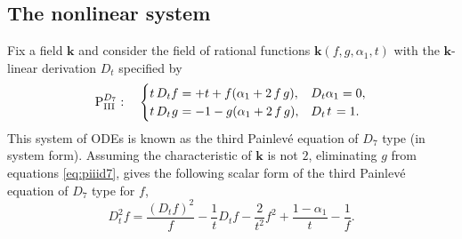 \documentclass[a4paper,reqno]{amsart}
\numberwithin{equation}{section}
\numberwithin{figure}{section}
\theoremstyle{remark}
\newcommand\Pthree{\textrm{P}_{\textrm{III}}}
\begin{document}
\subsection{The nonlinear system}
Fix a field $\mathbf{k}$ and consider the field of rational functions $\mathbf{k}(f,g,\alpha_1,t)$ with the $\mathbf{k}$-linear derivation $D_t$ specified by
 \begin{equation}\label{eq:piiid7}
 \Pthree^{D_7}:\quad           \begin{cases}
       t\, D_t f=+t+f(\alpha_1+2\,f\,g), &   D_t \alpha_1=0, \\
  t\, D_t \hspace{0.2mm}g\hspace{0.1mm}=-1-g(\alpha_1+2\,f\,g), &   D_t \hspace{0.4mm}t\hspace{0.4mm}=1. 
    \end{cases}
    \end{equation}
This system of ODEs is known as the third Painlev\'e equation of $D_7$ type (in system form). Assuming the characteristic of $\mathbf{k}$ is not $2$, eliminating $g$ from equations \eqref{eq:piiid7}, gives the following scalar form of the third Painlev\'e equation of $D_7$ type for $f$,
\begin{equation*}
    D_t^2f=\frac{(D_tf)^2}{f}-\frac{1}{t}D_tf-\frac{2}{t^2}f^2+\frac{1-\alpha_1}{t}-\frac{1}{f}.
\end{equation*}
\end{document}
